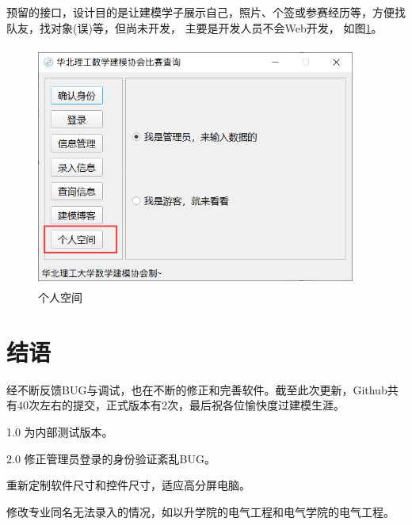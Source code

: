 \documentclass[cn, 11pt, chinese, show]{elegantbook}
\begin{document}
预留的接口，设计目的是让建模学子展示自己，照片、个签或参赛经历等，方便找队友，找对象(误)等，但尚未开发，
主要是开发人员不会Web开发， 如图\ref{fig:space}。

\begin{figure}[h]
    \centering
    \includegraphics[width=10.5cm, height=8cm]{figure/11.png}
    \caption{个人空间}
    \label{fig:space}
\end{figure}

\chapter{结语}

经不断反馈BUG与调试，也在不断的修正和完善软件。截至此次更新，Github共有40次左右的提交，正式版本有2次，最后祝各位愉快度过建模生涯。


\begin{change}
  \item 1.0 为内部测试版本。
  \item 2.0 修正管理员登录的身份验证紊乱BUG。
  \item 重新定制软件尺寸和控件尺寸，适应高分屏电脑。
  \item 修改专业同名无法录入的情况，如以升学院的电气工程和电气学院的电气工程。
\end{change}
\end{document}
